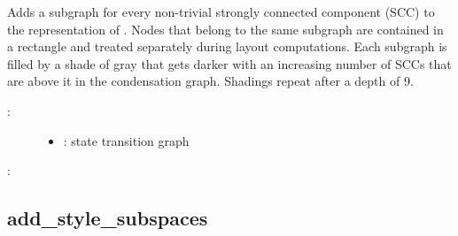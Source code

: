 \documentclass[letterpaper,10pt,english]{sphinxmanual}
\begin{document}
\begin{fulllineitems}
\label{\detokenize{StateTransitionGraphs:PyBoolNet.StateTransitionGraphs.add_style_sccs}}
Adds a subgraph for every non-trivial strongly connected component (SCC) to the  representation of .
Nodes that belong to the same  subgraph are contained in a rectangle and treated separately during layout computations.
Each subgraph is filled by a shade of gray that gets darker with an increasing number of SCCs that are above it in the condensation graph.
Shadings repeat after a depth of 9.
\begin{description}
\item[{:}] \leavevmode\begin{itemize}
\item {} 
: state transition graph

\end{itemize}

\end{description}

:

\begin{sphinxVerbatim}[commandchars=\\\{\}]
\end{sphinxVerbatim}

\end{fulllineitems}



\subsection{add\_style\_subspaces}
\label{\detokenize{StateTransitionGraphs:id21}}\label{\detokenize{StateTransitionGraphs:add-style-subspaces}}
\end{document}
